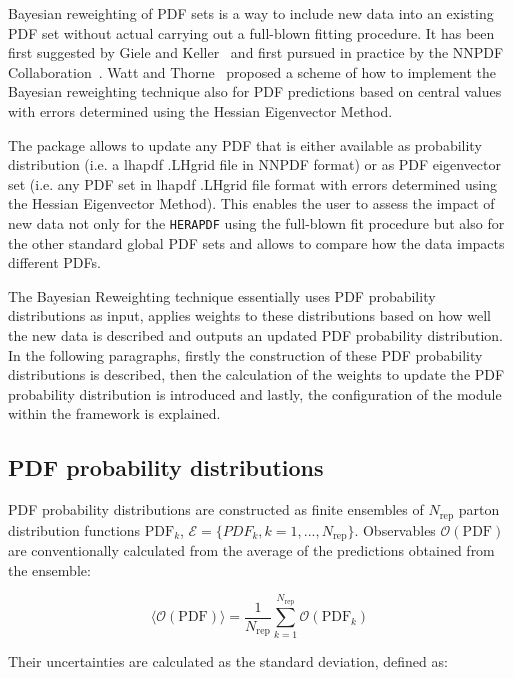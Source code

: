 Bayesian reweighting of PDF sets is a way to include new data into an existing PDF set without actual carrying out a full-blown fitting procedure. It has been first suggested by Giele and Keller~\cite{Giele:1998gw} and first pursued in practice by the NNPDF Collaboration~\cite{Ball:2011gg,Ball:2010gb}. Watt and Thorne~\cite{Watt:2012tq} proposed a scheme of how to implement the Bayesian reweighting technique also for PDF predictions based on central values with errors determined using the Hessian Eigenvector Method. 

The \fitter package allows to update any PDF that is either available as probability distribution (i.e. a lhapdf .LHgrid file in NNPDF format) or as PDF eigenvector set (i.e. any PDF set in lhapdf .LHgrid file format with errors determined using the Hessian Eigenvector Method). This enables the user to assess the impact of new data not only for the {\tt HERAPDF} using the full-blown fit procedure but also for the other standard global PDF sets and allows to compare how the data impacts different PDFs.

The Bayesian Reweighting technique essentially uses PDF probability distributions as input, applies weights to these distributions based on how well the new data is described and outputs an updated PDF probability distribution. In the following paragraphs, firstly the construction of these PDF probability distributions is described, then the calculation of the weights to update the PDF probability distribution is introduced and lastly, the configuration of the module within the \fitter framework is explained.

\subsection{PDF probability distributions}

PDF probability distributions are constructed as finite ensembles of $N_{\mathrm{rep}}$ parton distribution functions $\mathrm{PDF}_k$, $\mathcal{E} = \{PDF_k, k = 1, . . . ,N_{\mathrm{rep}}\}$. Observables $\mathcal{O}(\mathrm{PDF})$ are conventionally calculated from the average of the predictions obtained from the ensemble:

\begin{equation}
 \langle\mathcal{O}(\mathrm{PDF})\rangle = \frac{1}{N_{\mathrm{rep}}} \sum_{k=1}^{N_{\mathrm{rep}}} \mathcal{O}(\mathrm{PDF}_k)
\label{eq:meanReplicas}
\end{equation}
 
Their uncertainties are calculated as the standard deviation, defined as:

